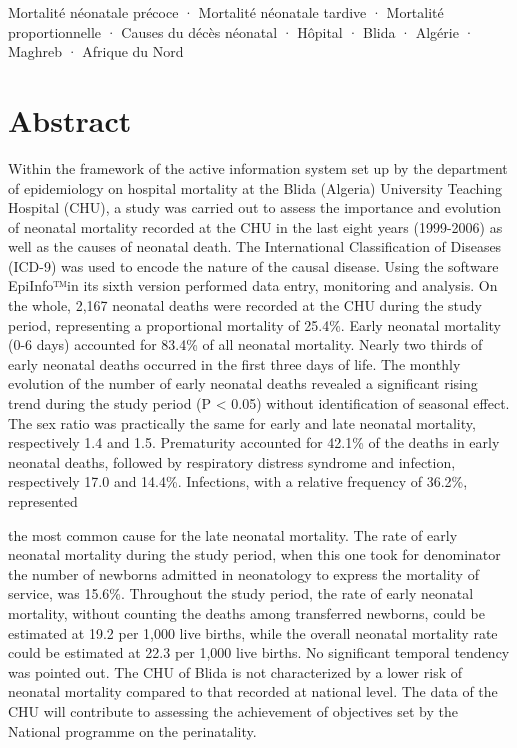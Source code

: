 \documentclass[
]{book}
\begin{document}
Mortalité néonatale précoce · Mortalité néonatale tardive · Mortalité
proportionnelle · Causes du décès néonatal · Hôpital · Blida · Algérie · Maghreb
· Afrique du Nord

\hypertarget{abstract}{%
\section{Abstract}\label{abstract}}

Within the framework of the active information system set up by the department
of epidemiology on hospital mortality at the Blida (Algeria) University Teaching
Hospital (CHU), a study was carried out to assess the importance and evolution
of neonatal mortality recorded at the CHU in the last eight years (1999-2006) as
well as the causes of neonatal death. The International Classification of
Diseases (ICD-9) was used to encode the nature of the causal disease. Using the
software EpiInfo™in its sixth version performed data entry, monitoring and
analysis. On the whole, 2,167 neonatal deaths were recorded at the CHU during
the study period, representing a proportional mortality of 25.4\%. Early neonatal
mortality (0-6 days) accounted for 83.4\% of all neonatal mortality. Nearly two
thirds of early neonatal deaths occurred in the first three days of life. The
monthly evolution of the number of early neonatal deaths revealed a significant
rising trend during the study period (P \textless{} 0.05) without identification of
seasonal effect. The sex ratio was practically the same for early and late
neonatal mortality, respectively 1.4 and 1.5. Prematurity accounted for 42.1\% of
the deaths in early neonatal deaths, followed by respiratory distress syndrome
and infection, respectively 17.0 and 14.4\%. Infections, with a relative
frequency of 36.2\%, represented

the most common cause for the late neonatal mortality. The rate of early
neonatal mortality during the study period, when this one took for denominator
the number of newborns admitted in neonatology to express the mortality of
service, was 15.6\%. Throughout the study period, the rate of early neonatal
mortality, without counting the deaths among transferred newborns, could be
estimated at 19.2 per 1,000 live births, while the overall neonatal mortality
rate could be estimated at 22.3 per 1,000 live births. No significant temporal
tendency was pointed out. The CHU of Blida is not characterized by a lower risk
of neonatal mortality compared to that recorded at national level. The data of
the CHU will contribute to assessing the achievement of objectives set by the
National programme on the perinatality.
\end{document}
